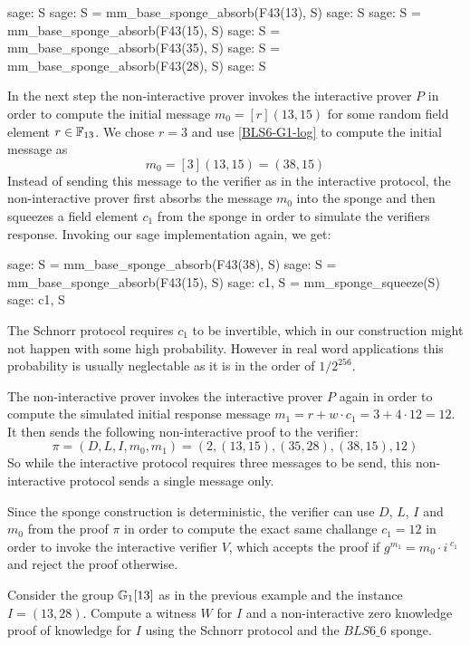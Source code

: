 \begin{example}
\begin{sagecommandline}
sage: S
sage: S = mm_base_sponge_absorb(F43(13), S)
sage: S 
sage: S = mm_base_sponge_absorb(F43(15), S)
sage: S = mm_base_sponge_absorb(F43(35), S)
sage: S = mm_base_sponge_absorb(F43(28), S)
sage: S
\end{sagecommandline}
In the next step the non-interactive prover invokes the interactive prover $P$ in order to compute the initial message $m_0=[r](13,15)$ for some random field element $r\in \mathbb{F}_{13}$. We chose $r=3$ and use \ref{BLS6-G1-log} to compute the initial message as
$$
m_0 = [3](13,15) = (38,15)
$$
Instead of sending this message to the verifier as in the interactive protocol, the non-interactive prover first absorbs the message $m_0$ into the sponge and then squeezes a field element $c_1$ from the sponge in order to simulate the verifiers response. Invoking our sage implementation again, we get: 
\begin{sagecommandline}
sage: S = mm_base_sponge_absorb(F43(38), S)
sage: S = mm_base_sponge_absorb(F43(15), S)
sage: c1, S = mm_sponge_squeeze(S)
sage: c1, S
\end{sagecommandline}
The Schnorr protocol requires $c_1$ to be invertible, which in our construction might not happen with some high probability. However in real word applications this probability is usually neglectable as it is in the order of $1/2^{256}$.

The non-interactive prover invokes the interactive prover $P$ again in order to compute the simulated initial response message $m_1=r+w\cdot c_1= 3+4\cdot 12 = 12$. It then sends the following non-interactive proof to the verifier:
$$
\pi = (D,L,I,m_0,m_1) = (2, (13,15) , (35,28), (38,15), 12)
$$
So while the interactive protocol requires three messages to be send, this non-interactive protocol sends a single message only.

Since the sponge construction is deterministic, the verifier can use $D$, $L$, $I$ and $m_0$ from the proof $\pi$ in order to compute the exact same challange $c_1=12$ in order to invoke the interactive verifier $V$, which accepts the proof if $g^{m_1} = m_0\cdot i^{\;c_1}$ and reject the proof otherwise.
\end{example}
\begin{exercise} Consider the group $\mathbb{G}_1[13]$ as in the previous example and the instance $I=(13,28)$. Compute a witness $W$ for $I$ and a non-interactive zero knowledge proof of knowledge for $I$ using the Schnorr protocol and the $BLS6\_6$ sponge. 
\end{exercise}
